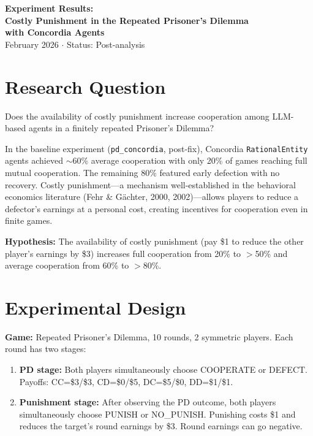 \documentclass[11pt]{article}
\begin{document}
\begin{center}
{\Large \textbf{Experiment Results:\\Costly Punishment in the Repeated Prisoner's Dilemma\\with Concordia Agents}}\\[0.5em]
{\large February 2026 \quad $\cdot$ \quad Status: Post-analysis}
\end{center}

\section*{Research Question}

Does the availability of costly punishment increase cooperation among LLM-based agents in a finitely repeated Prisoner's Dilemma?

In the baseline experiment (\texttt{pd\_concordia}, post-fix), Concordia \texttt{RationalEntity} agents achieved $\sim$60\% average cooperation with only 20\% of games reaching full mutual cooperation. The remaining 80\% featured early defection with no recovery. Costly punishment---a mechanism well-established in the behavioral economics literature (Fehr \& G\"achter, 2000, 2002)---allows players to reduce a defector's earnings at a personal cost, creating incentives for cooperation even in finite games.

\textbf{Hypothesis:} The availability of costly punishment (pay \$1 to reduce the other player's earnings by \$3) increases full cooperation from 20\% to $>$50\% and average cooperation from 60\% to $>$80\%.

\section*{Experimental Design}

\textbf{Game:} Repeated Prisoner's Dilemma, 10 rounds, 2 symmetric players. Each round has two stages:

\begin{enumerate}
\item \textbf{PD stage:} Both players simultaneously choose COOPERATE or DEFECT. Payoffs: CC=\$3/\$3, CD=\$0/\$5, DC=\$5/\$0, DD=\$1/\$1.
\item \textbf{Punishment stage:} After observing the PD outcome, both players simultaneously choose PUNISH or NO\_PUNISH. Punishing costs \$1 and reduces the target's round earnings by \$3. Round earnings can go negative.
\end{enumerate}
\end{document}
